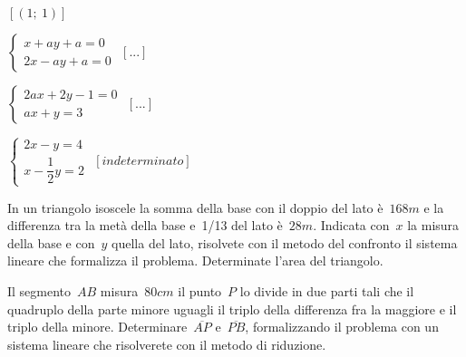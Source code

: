 \begin{esercizio}[\Ast]
\begin{multicols}{2}
\begin{enumeratea}
 \hfill $\left[(1;~1)\right]$
 \item $\left\{\begin{array}{l}x+ay+a=0\\2x-ay+a=0\end{array}\right.$
 \hfill $\left[...\right]$
 \item $\left\{\begin{array}{l}2ax+2y-1=0\\ax+y=3\end{array}\right.$
 \hfill $\left[...\right]$
 \item $\left\{\begin{array}{l}2x-y=4\\x-\dfrac{1}{2}y=2\end{array}\right.$
 \hfill $\left[indeterminato\right]$
\end{enumeratea}
 \end{multicols}
\end{esercizio}

\begin{esercizio}
 \label{ese:22.19}
In un triangolo isoscele la somma della base con il doppio del lato
è~$168\unit{m}$ e la differenza tra la metà della base e~1/13 del lato 
è~$28\unit{m}$.
Indicata con~$x$ la misura della base e con~$y$ quella del lato,
risolvete con il metodo del confronto il sistema lineare che formalizza
il problema. Determinate l'area del triangolo.
 \end{esercizio}

\begin{esercizio}
 \label{ese:22.23}
Il segmento~$AB$ misura~$80\unit{cm}$ il punto~$P$ lo divide in due parti tali 
che il quadruplo della parte minore uguagli il triplo della differenza fra 
la maggiore e il triplo della minore. 
Determinare~$\overline{AP}$ e~$\overline{PB}$, formalizzando
il problema con un sistema lineare che risolverete con il metodo di
riduzione.
\begin{center}
 
\end{center}
\end{esercizio}

